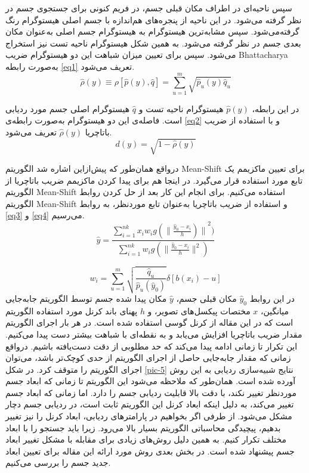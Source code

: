 \documentclass[paper=a4, fontsize=12pt]{article} %
\begin{document}
سپس ناحیه‌ای در اطراف مکان قبلی جسم، در فریم کنونی برای جستجوی جسم در نظر گرفته می‌شود. در  این ناحیه از پنجره‌های هم‌اندازه با جسم اصلی هیستوگرام رنگ گرفته‌می‌شود. سپس مشابه‌ترین هیستوگرام به هیستوگرام جسم اصلی به‌عنوان مکان بعدی جسم در نظر گرفته می‌شود.
به همین شکل هیستوگرام ناحیه تست نیز استخراج می‌شود. سپس برای تعیین میزان شباهت این دو هیستوگرام ضریب Bhattacharya به‌صورت رابطه \ref{eq1} تعریف می‌شود.
\begin{equation}
\hat{\rho}(y)  \equiv \rho[\hat{p}(y),\hat{q}] = \sum_{u=1}^{m}{\sqrt{\hat{p}_u(y)\hat{q}_u}}
\label{eq1}
\end{equation}

در این رابطه، $\hat{p}(y)$ هیستوگرام ناحیه تست و $\hat{q}$ هیستوگرام اصلی جسم مورد ردیابی است. فاصله‌ی این دو هیستوگرام به‌صورت رابطه‌ی \ref{eq2} و با استفاده از ضریب باتاچریا $\hat{\rho}(y)$ تعریف می‌شود.
\begin{equation}
d(y) = \sqrt{1 - \hat{\rho}(y) }
\label{eq2}
\end{equation}

درواقع همان‌طور که پیش‌ازاین اشاره شد الگوریتم Mean-Shift برای تعیین ماکزیمم یک تابع مورد استفاده قرار می‌گیرد. در اینجا هم برای پیدا کردن ماکزیمم ضریب باتاچریا از الگوریتم Mean-Shift استفاده می‌کنیم. برای انجام این کار بعد از حل کردن روابط الگوریتم Mean-Shift و استفاده از ضریب باتاچریا به‌عنوان تابع موردنظر، به روابط   \ref{eq3} و \ref{eq4} می‌رسیم. 
\begin{equation}
\hat{y}=\frac{\sum_{i=1}^{nk}{x_iw_ig(\| \frac{\hat{y}_0-x_i}{h})\|}^2)}{\sum_{i=1}^{nk}{w_ig(\| \frac{\hat{y}_0-x_i}{h}\|^2)}}
\label{eq3}
\end{equation}

\begin{equation}
w_i=\sum_{u=1}^{m}{\sqrt{\frac{\hat{q}_u}{\hat{p}_u(\hat{y}_0)}}\delta[b(x_i)-u]}
\label{eq4}
\end{equation}
در این روابط $\hat{y}_0$ مکان قبلی جسم،  $\hat{y}$ مکان پیدا شده جسم توسط الگوریتم جابه‌جایی میانگین، $x$ مختصات پیکسل‌های تصویر، و $h$ پهنای باند کرنل مورد استفاده الگوریتم است که در این مقاله از کرنل گوسی استفاده شده است.
در هر بار اجرای الگوریتم مقدار ضریب باتاچریا افزایش می‌یابد و به نقطه‌ای با شباهت بیشتر دست پیدا می‌کنیم. این تکرار تا زمانی ادامه پیدا می‌کند که حد مطلوبی از دقت دست‌یافته باشیم. درواقع زمانی که مقدار جابه‌جایی حاصل از اجرای الگوریتم از حدی کوچک‌تر باشد، می‌توان اجرای الگوریتم را متوقف کرد.
در شکل \ref{pic-5} نتایج شبیه‌سازی ردیابی به این روش آورده شده است. همان‌طور که ملاحظه می‌شود این الگوریتم تا زمانی که ابعاد جسم موردنظر تغییر نکند، با دقت بالا قابلیت ردیابی جسم را دارد. اما زمانی که ابعاد جسم تغییر می‌کند، به دلیل اینکه ابعاد کرنل این الگوریتم ثابت است، در ردیابی جسم دچار مشکل می‌شود. از طرفی اگر بخواهیم در پارامترهای ردیابی، ابعاد کرنل را نیز تغییر بدهیم، پیچیدگی محاسباتی الگوریتم بسیار بالا می‌رود. زیرا باید جستجو را با ابعاد مختلف تکرار کنیم. به همین دلیل روش‌های زیادی برای مقابله با مشکل تغییر ابعاد جسم پیشنهاد شده است. در بخش بعدی روش مورد ارائه این مقاله برای تعیین ابعاد جدید جسم را بررسی می‌کنیم.
\end{document}
